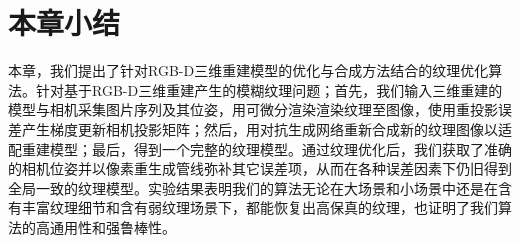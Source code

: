 \section{本章小结}

本章，我们提出了针对RGB-D三维重建模型的优化与合成方法结合的纹理优化算法。针对基于RGB-D三维重建产生的模糊纹理问题；首先，我们输入三维重建的模型与相机采集图片序列及其位姿，用可微分渲染渲染纹理至图像，使用重投影误差产生梯度更新相机投影矩阵；然后，用对抗生成网络重新合成新的纹理图像以适配重建模型；最后，得到一个完整的纹理模型。通过纹理优化后，我们获取了准确的相机位姿并以像素重生成管线弥补其它误差项，从而在各种误差因素下仍旧得到全局一致的纹理模型。实验结果表明我们的算法无论在大场景和小场景中还是在含有丰富纹理细节和含有弱纹理场景下，都能恢复出高保真的纹理，也证明了我们算法的高通用性和强鲁棒性。



